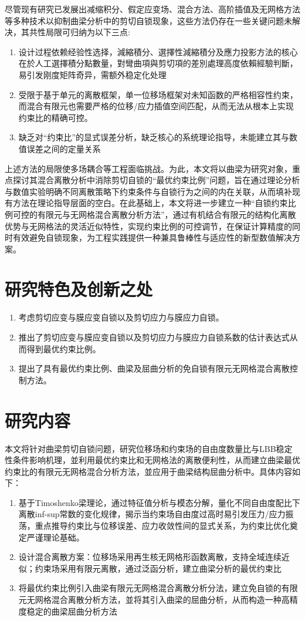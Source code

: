 尽管现有研究已发展出减缩积分、假定应变场、混合方法、高阶插值及无网格方法等多种技术以抑制曲梁分析中的剪切自锁现象，这些方法仍存在一些关键问题未解决，其共性局限可归纳为以下三点:
\begin{enumerate}
\item 设计过程依赖经验性选择，減縮積分、選擇性減縮積分及應力投影方法的核心在於人工選擇積分點數量，對彎曲項與剪切項的差別處理高度依賴經驗判斷，易引发刚度矩阵奇异，需额外稳定化处理
\item 受限于基于单元的离散框架，单一位移场框架对未知函数的严格相容性约束，而混合有限元也需要严格的位移/应力插值空间匹配，从而无法从根本上实现约束比的精确可控。
\item 缺乏对“约束比”的显式误差分析，缺乏核心的系统理论指导，未能建立其与数值误差之间的定量关系
\end{enumerate}
上述方法的局限使多场耦合等工程面临挑战。为此，本文将以曲梁为研究对象，重点探讨其混合离散分析中消除剪切自锁的“最优约束比例”问题，旨在通过理论分析与数值实验明确不同离散策略下约束条件与自锁行为之间的内在关联，从而填补现有方法在理论指导层面的空白。在此基础上，本文将进一步建立一种“自锁约束比例可控的有限元与无网格混合离散分析方法”，通过有机结合有限元的结构化离散优势与无网格法的灵活近似特性，实现约束比例的可控调节，在保证计算精度的同时有效避免自锁现象，为工程实践提供一种兼具鲁棒性与适应性的新型数值解决方案。



\section{研究特色及创新之处}
\begin{enumerate}
\item 考虑剪切应变与膜应变自锁以及剪切应力与膜应力自锁。
\item 推出了剪切应变与膜应变自锁以及剪切应力与膜应力自锁系数的估计表达式从而得到最优约束比例。
\item 提出了具有最优约束比例、曲梁及屈曲分析的免自锁有限元无网格混合离散控制方法。
\end{enumerate}
\section{研究内容}

本文将针对曲梁剪切自锁问题，研究位移场和约束场的自由度数量比与LBB稳定性条件影响机理，並利用最优约束比和无网格法的离散便利性，从而建立曲梁最优约束比的有限元无网格混合分析方法，並应用于曲梁结构屈曲分析中。具体内容如下：

\begin{enumerate}
    \item 基于Timoshenko梁理论，通过特征值分析与模态分解，量化不同自由度配比下离散inf-sup常数的变化规律，揭示当约束场自由度过高时易引发压力/应力振荡，重点推导约束比与位移误差、应力收敛性间的显式关系，为约束比优化奠定严谨理论基础。
    \item 设计混合离散方案：位移场采用再生核无网格形函数离散，支持全域连续近似；约束场采用有限元离散，通过泛函分析，建立曲梁分析的最优约束比
    \item 将最优约束比例引入曲梁有限元无网格混合离散分析分法，建立免自锁的有限元无网格混合离散分析方法，並将其引入曲梁的屈曲分析，从而构造一种高精度稳定的曲梁屈曲分析方法
\end{enumerate}

